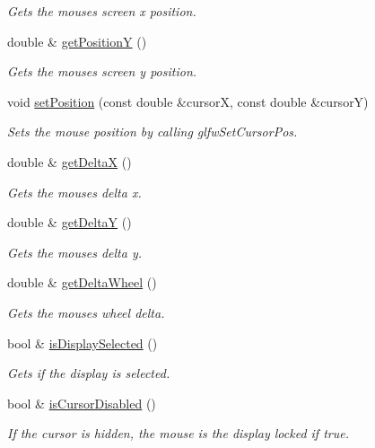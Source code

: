 \begin{DoxyCompactItemize}
\begin{DoxyCompactList}\small\item\em Gets the mouses screen x position. \end{DoxyCompactList}\item 
double \& \hyperlink{classflounder_1_1mouse_abd3a3246b13da0b537d632057398cf7d}{get\+PositionY} ()
\begin{DoxyCompactList}\small\item\em Gets the mouses screen y position. \end{DoxyCompactList}\item 
void \hyperlink{classflounder_1_1mouse_a47fae906e36e62f4cfd5939b37a0476c}{set\+Position} (const double \&cursorX, const double \&cursorY)
\begin{DoxyCompactList}\small\item\em Sets the mouse position by calling glfw\+Set\+Cursor\+Pos. \end{DoxyCompactList}\item 
double \& \hyperlink{classflounder_1_1mouse_a4c1a6fdbd6c23fc64bfbbd3deca4af44}{get\+DeltaX} ()
\begin{DoxyCompactList}\small\item\em Gets the mouses delta x. \end{DoxyCompactList}\item 
double \& \hyperlink{classflounder_1_1mouse_ae252e366acee241385420000dc23b748}{get\+DeltaY} ()
\begin{DoxyCompactList}\small\item\em Gets the mouses delta y. \end{DoxyCompactList}\item 
double \& \hyperlink{classflounder_1_1mouse_ac1d5941ff7835327c4a90e1259934cf2}{get\+Delta\+Wheel} ()
\begin{DoxyCompactList}\small\item\em Gets the mouses wheel delta. \end{DoxyCompactList}\item 
bool \& \hyperlink{classflounder_1_1mouse_af10548a35c672453067ca5adb3da1787}{is\+Display\+Selected} ()
\begin{DoxyCompactList}\small\item\em Gets if the display is selected. \end{DoxyCompactList}\item 
bool \& \hyperlink{classflounder_1_1mouse_a926fbecc60a04f4ca3bc3e8afa9382d4}{is\+Cursor\+Disabled} ()
\begin{DoxyCompactList}\small\item\em If the cursor is hidden, the mouse is the display locked if true. \end{DoxyCompactList}\end{DoxyCompactItemize}
